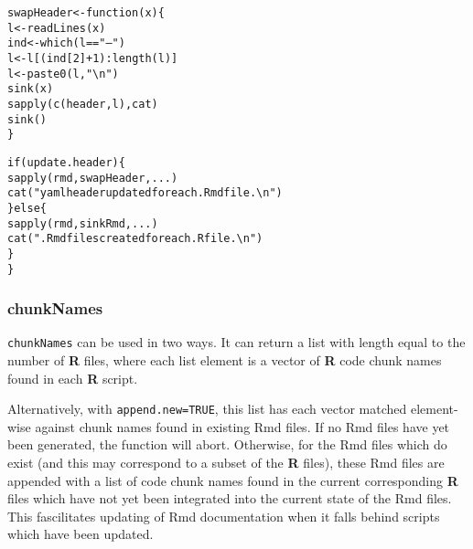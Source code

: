 \documentclass{article}\usepackage[]{graphicx}\usepackage[]{color}
\makeatletter
\newcommand{\hlnum}[1]{\textcolor[rgb]{0.863,0.196,0.184}{#1}}%
\newcommand{\hlstr}[1]{\textcolor[rgb]{0.863,0.196,0.184}{#1}}%
\newcommand{\hlopt}[1]{\textcolor[rgb]{0.576,0.631,0.631}{#1}}%
\newcommand{\hlstd}[1]{\textcolor[rgb]{0.514,0.58,0.588}{#1}}%
\newcommand{\hlkwa}[1]{\textcolor[rgb]{0.796,0.294,0.086}{#1}}%
\newcommand{\hlkwb}[1]{\textcolor[rgb]{0.522,0.6,0}{#1}}%
\newcommand{\hlkwc}[1]{\textcolor[rgb]{0.796,0.294,0.086}{#1}}%
\newcommand{\hlkwd}[1]{\textcolor[rgb]{0.576,0.631,0.631}{#1}}%
\newenvironment{kframe}{%
 \def\at@end@of@kframe{}%
 \ifinner\ifhmode%
  \def\at@end@of@kframe{\end{minipage}}%
  \begin{minipage}{\columnwidth}%
 \fi\fi%
 \def\FrameCommand##1{\hskip\@totalleftmargin \hskip-\fboxsep
 \colorbox{shadecolor}{##1}\hskip-\fboxsep
     \hskip-\linewidth \hskip-\@totalleftmargin \hskip\columnwidth}%
 \MakeFramed {\advance\hsize-\width
   \@totalleftmargin\z@ \linewidth\hsize
   \@setminipage}}%
 {\par\unskip\endMakeFramed%
 \at@end@of@kframe}
\newenvironment{knitrout}{}{} %
\makeatother
\begin{document}
\begin{knitrout}
\begin{kframe}
\begin{alltt}
    \hlstd{swapHeader} \hlkwb{<-} \hlkwa{function}\hlstd{(}\hlkwc{x}\hlstd{) \{}
        \hlstd{l} \hlkwb{<-} \hlkwd{readLines}\hlstd{(x)}
        \hlstd{ind} \hlkwb{<-} \hlkwd{which}\hlstd{(l} \hlopt{==} \hlstr{"---"}\hlstd{)}
        \hlstd{l} \hlkwb{<-} \hlstd{l[(ind[}\hlnum{2}\hlstd{]} \hlopt{+} \hlnum{1}\hlstd{)}\hlopt{:}\hlkwd{length}\hlstd{(l)]}
        \hlstd{l} \hlkwb{<-} \hlkwd{paste0}\hlstd{(l,} \hlstr{"\textbackslash{}n"}\hlstd{)}
        \hlkwd{sink}\hlstd{(x)}
        \hlkwd{sapply}\hlstd{(}\hlkwd{c}\hlstd{(header, l), cat)}
        \hlkwd{sink}\hlstd{()}
    \hlstd{\}}

    \hlkwa{if} \hlstd{(update.header) \{}
        \hlkwd{sapply}\hlstd{(rmd, swapHeader, ...)}
        \hlkwd{cat}\hlstd{(}\hlstr{"yaml header updated for each .Rmd file.\textbackslash{}n"}\hlstd{)}
    \hlstd{\}} \hlkwa{else} \hlstd{\{}
        \hlkwd{sapply}\hlstd{(rmd, sinkRmd, ...)}
        \hlkwd{cat}\hlstd{(}\hlstr{".Rmd files created for each .R file.\textbackslash{}n"}\hlstd{)}
    \hlstd{\}}
\hlstd{\}}
\end{alltt}
\end{kframe}
\end{knitrout}

\subsubsection{chunkNames}
\texttt{chunkNames} can be used in two ways.
It can return a list with length equal to the number of \textbf{R} files,
where each list element is a vector of \textbf{R} code chunk names found in each \textbf{R} script.

Alternatively, with \texttt{append.new=TRUE}, this list has each vector matched element-wise against chunk names found in existing Rmd files.
If no Rmd files have yet been generated, the function will abort.
Otherwise, for the Rmd files which do exist (and this may correspond to a subset of the \textbf{R} files),
these Rmd files are appended with a list of code chunk names found in the current corresponding \textbf{R} files
which have not yet been integrated into the current state of the Rmd files.
This fascilitates updating of Rmd documentation when it falls behind scripts which have been updated.
\end{document}
